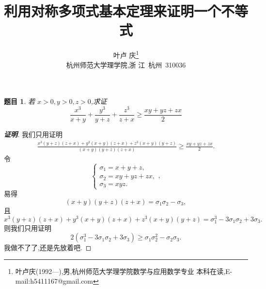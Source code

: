 \documentclass[twoside,11pt]{article}
\newtheorem*{timu}{题目}
\begin{document}
\title{\huge{\bf{利用对称多项式基本定理来证明一个不等式}}} \author{\small{叶卢
    庆\footnote{叶卢庆(1992---),男,杭州师范大学理学院数学与应用数学专业
      本科在读,E-mail:h5411167@gmail.com}}\\{\small{杭州师范大学理学院,浙
      江~杭州~310036}}} 
\maketitle
\vspace{30pt}
\begin{timu}
若 $x>0,y>0,z>0$,求证
$$
\frac{x^3}{x+y}+\frac{y^3}{y+z}+\frac{z^3}{z+x}\geq \frac{xy+yz+zx}{2}
$$
\end{timu}
\begin{proof}[\textbf{证明}]
我们只用证明
  \begin{align*}
    \frac{x^3(y+z)(z+x)+y^3(x+y)(z+x)+z^3(x+y)(y+z)}{(x+y)(y+z)(z+x)}\geq \frac{xy+yz+zx}{2}.
  \end{align*}
令
$$
\begin{cases}
  \sigma_1=x+y+z,\\
\sigma_2=xy+yz+zx,\\
\sigma_3=xyz.
\end{cases},
$$
易得
$$
(x+y)(y+z)(z+x)=\sigma_1\sigma_2-\sigma_3,
$$
且
$$
x^3(y+z)(z+x)+y^3(x+y)(z+x)+z^3(x+y)(y+z)=\sigma_1^3-3\sigma_1\sigma_2+3\sigma_3.
$$
则我们只用证明
$$
2(\sigma_1^3-3\sigma_1\sigma_2+3\sigma_3)\geq \sigma_1\sigma_2^2-\sigma_2\sigma_3.
$$
我做不了了,还是先放着吧.
\end{proof}
\end{document}
